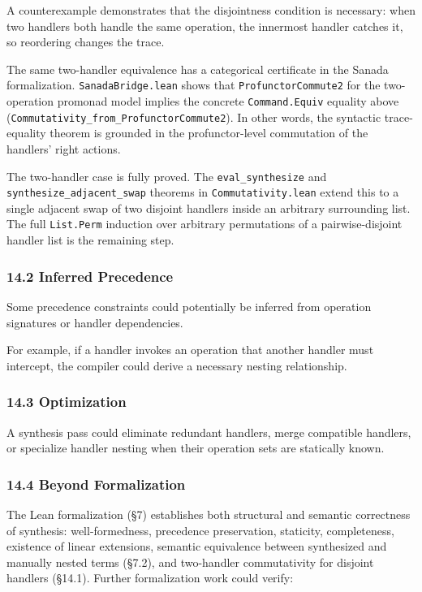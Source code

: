 \documentclass[
  11pt,
]{article}
\begin{document}
A counterexample demonstrates that the disjointness condition is
necessary: when two handlers both handle the same operation, the
innermost handler catches it, so reordering changes the trace.

The same two-handler equivalence has a categorical certificate in the
Sanada formalization. \texttt{SanadaBridge.lean} shows that
\texttt{ProfunctorCommute2} for the two-operation promonad model implies
the concrete \texttt{Command.Equiv} equality above
(\texttt{Commutativity\_from\_ProfunctorCommute2}). In other words, the
syntactic trace-equality theorem is grounded in the profunctor-level
commutation of the handlers' right actions.

The two-handler case is fully proved. The \texttt{eval\_synthesize} and
\texttt{synthesize\_adjacent\_swap} theorems in
\texttt{Commutativity.lean} extend this to a single adjacent swap of two
disjoint handlers inside an arbitrary surrounding list. The full
\texttt{List.Perm} induction over arbitrary permutations of a
pairwise-disjoint handler list is the remaining step.

\subsubsection{14.2 Inferred Precedence}\label{inferred-precedence}

Some precedence constraints could potentially be inferred from operation
signatures or handler dependencies.

For example, if a handler invokes an operation that another handler must
intercept, the compiler could derive a necessary nesting relationship.

\subsubsection{14.3 Optimization}\label{optimization}

A synthesis pass could eliminate redundant handlers, merge compatible
handlers, or specialize handler nesting when their operation sets are
statically known.

\subsubsection{14.4 Beyond Formalization}\label{beyond-formalization}

The Lean formalization (§7) establishes both structural and semantic
correctness of synthesis: well-formedness, precedence preservation,
staticity, completeness, existence of linear extensions, semantic
equivalence between synthesized and manually nested terms (§7.2), and
two-handler commutativity for disjoint handlers (§14.1). Further
formalization work could verify:
\end{document}

